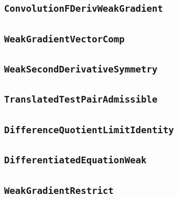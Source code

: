 \documentclass[11pt]{amsart}
\theoremstyle{definition}
\begin{document}
\subsection{\texorpdfstring{\texttt{ConvolutionFDerivWeakGradient}}{ConvolutionFDerivWeakGradient}}\label{node:ConvolutionFDerivWeakGradient}


\subsection{\texorpdfstring{\texttt{WeakGradientVectorComp}}{WeakGradientVectorComp}}\label{node:WeakGradientVectorComp}


\subsection{\texorpdfstring{\texttt{WeakSecondDerivativeSymmetry}}{WeakSecondDerivativeSymmetry}}\label{node:WeakSecondDerivativeSymmetry}


\subsection{\texorpdfstring{\texttt{TranslatedTestPairAdmissible}}{TranslatedTestPairAdmissible}}\label{node:TranslatedTestPairAdmissible}


\subsection{\texorpdfstring{\texttt{DifferenceQuotientLimitIdentity}}{DifferenceQuotientLimitIdentity}}\label{node:DifferenceQuotientLimitIdentity}


\subsection{\texorpdfstring{\texttt{DifferentiatedEquationWeak}}{DifferentiatedEquationWeak}}\label{node:DifferentiatedEquationWeak}


\subsection{\texorpdfstring{\texttt{WeakGradientRestrict}}{WeakGradientRestrict}}\label{node:WeakGradientRestrict}

\end{document}
